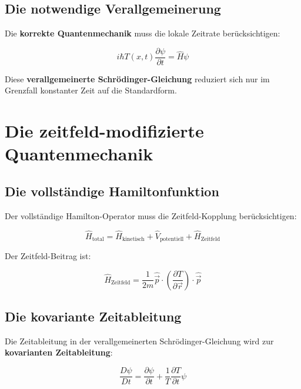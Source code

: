 \documentclass[12pt,a4paper]{report}
\begin{document}
\subsection{Die notwendige Verallgemeinerung}

Die \textbf{korrekte Quantenmechanik} muss die lokale Zeitrate berücksichtigen:

\begin{equation}
	i\hbar T(x,t)\frac{\partial\psi}{\partial t} = \hat{H}\psi
\end{equation}

Diese \textbf{verallgemeinerte Schrödinger-Gleichung} reduziert sich nur im Grenzfall konstanter Zeit auf die Standardform.

\section{Die zeitfeld-modifizierte Quantenmechanik}

\subsection{Die vollständige Hamiltonfunktion}

Der vollständige Hamilton-Operator muss die Zeitfeld-Kopplung berücksichtigen:

\begin{equation}
	\hat{H}_{\text{total}} = \hat{H}_{\text{kinetisch}} + \hat{V}_{\text{potentiell}} + \hat{H}_{\text{Zeitfeld}}
\end{equation}

Der Zeitfeld-Beitrag ist:

\begin{equation}
	\hat{H}_{\text{Zeitfeld}} = \frac{1}{2m}\hat{\vec{p}} \cdot \left(\frac{\partial T}{\partial \vec{r}}\right) \cdot \hat{\vec{p}}
\end{equation}

\subsection{Die kovariante Zeitableitung}

Die Zeitableitung in der verallgemeinerten Schrödinger-Gleichung wird zur \textbf{kovarianten Zeitableitung}:

\begin{equation}
	\frac{D\psi}{Dt} = \frac{\partial\psi}{\partial t} + \frac{1}{T}\frac{\partial T}{\partial t}\psi
\end{equation}
\end{document}

